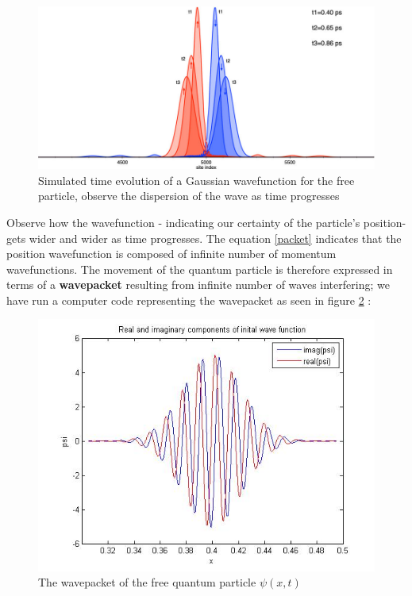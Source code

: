   \begin{figure}[h!]
  	\centering 
  	\label{timeevolution}
  	\includegraphics[width = 0.8 \textwidth]{./figures/packet.jpg}
  	\caption{Simulated time evolution of a Gaussian wavefunction for the free particle, observe the dispersion of the wave as time progresses }
  \end{figure}
  Observe how the wavefunction - indicating our certainty of the particle's position- gets wider and wider as time progresses. The equation \eqref{packet} indicates that the position wavefunction is composed of infinite number of momentum wavefunctions. The movement of the quantum particle is therefore expressed in terms of a \textbf{wavepacket} resulting from infinite number of waves interfering; we have run a computer code representing the wavepacket as seen in figure \ref{wavepacket} :
  \begin{figure}[h!]
  	\centering 
  	\label{wavepacket}
  	\includegraphics[width = 0.8 \textwidth]{./figures/wavefunction.jpg}
  	\caption{The wavepacket of the free quantum particle $ \psi(x,t)$ }
  \end{figure}

